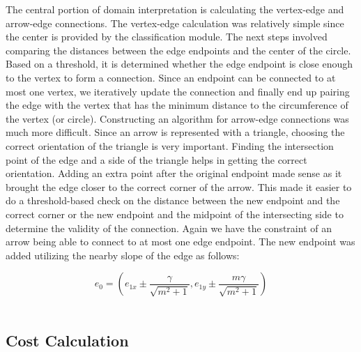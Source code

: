 The central portion of domain interpretation is calculating the vertex-edge and arrow-edge connections. The vertex-edge calculation was relatively simple since the center is provided by the classification module. The next steps involved comparing the distances between the edge endpoints and the center of the circle. Based on a threshold, it is determined whether the edge endpoint is close enough to the vertex to form a connection. Since an endpoint can be connected to at most one vertex, we iteratively update the connection and finally end up pairing the edge with the vertex that has the minimum distance to the circumference of the vertex (or circle). Constructing an algorithm for arrow-edge connections was much more difficult. Since an arrow is represented with a triangle, choosing the correct orientation of the triangle is very important. Finding the intersection point of the edge and a side of the triangle helps in getting the correct orientation. Adding an extra point after the original endpoint made sense as it brought the edge closer to the correct corner of the arrow. This made it easier to do a threshold-based check on the distance between the new endpoint and the correct corner or the new endpoint and the midpoint of the intersecting side to determine the validity of the connection. Again we have the constraint of an arrow being able to connect to at most one edge endpoint. The new endpoint was added utilizing the nearby slope of the edge as follows:

\begin{equation}
	e_0 = (e_{1x} \pm \frac{\gamma}{\sqrt{m^2+1}},e_{1y} \pm \frac{m\gamma}{\sqrt{m^2+1}})
\end{equation} \\

\subsection{Cost Calculation}

